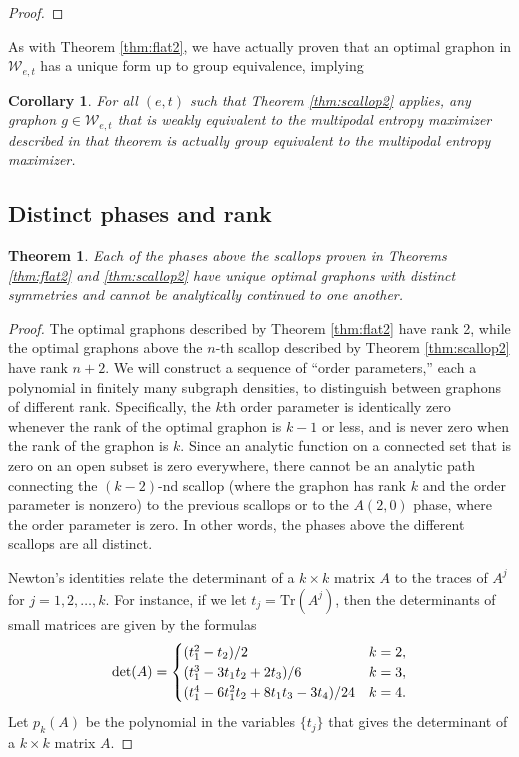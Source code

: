 \documentclass[12pt]{amsart}
\newtheorem{corollary}[lemma]{Corollary}
\newtheorem{theorem}[lemma]{Theorem}
\newcommand\TR{\mathrm{Tr}}
\newcommand\be{\begin{equation}}
\newcommand\ee{\end{equation}}
\newcommand{\regular}{\mathcal{W}}
\begin{document}
{\begin{proof}
\end{proof}

As with Theorem \ref{thm:flat2}, we have actually proven that an optimal graphon
in $\regular_{e,t}$ has a unique form up to group equivalence, implying

\begin{corollary} \label{cor:scallop2} For all $(e,t)$ such that Theorem 
\ref{thm:scallop2} applies, any graphon $g \in \regular_{e,t}$ that is weakly equivalent to the 
multipodal entropy maximizer described in that theorem is actually group 
equivalent to the multipodal entropy maximizer. 
\end{corollary}

\subsection{Distinct phases and rank}\label{OrderParam}

\begin{theorem} \label{thm:orderparameter2}
Each of the phases above the scallops proven in Theorems \ref{thm:flat2} and \ref{thm:scallop2} have unique optimal graphons with distinct symmetries and cannot be analytically continued to one another.
\end{theorem}

\begin{proof} 
The optimal graphons described by Theorem 
\ref{thm:flat2} have rank 2, while the optimal graphons above the 
$n$-th scallop described by Theorem \ref{thm:scallop2} have rank $n+2$.
We will construct a sequence of ``order parameters,'' each a polynomial
in finitely many subgraph densities, to distinguish between graphons 
of different rank. Specifically, the $k$th order parameter is 
identically zero whenever the rank of the optimal 
graphon is $k-1$ or less, and is never zero when the rank of the graphon is 
$k$. Since an analytic function on a connected set 
that is zero on an open subset is zero everywhere, there cannot be 
an analytic path connecting the $(k-2)$-nd scallop (where the graphon
has rank $k$ and the order parameter is nonzero) to the previous scallops
or to the $A(2,0)$ phase, where the order parameter is zero. 
In other words,
the phases above the different scallops are all distinct. 

Newton's identities relate the determinant of a $k \times k$ matrix $A$ to
the traces of $A^j$ for $j=1,2,\ldots, k$. For instance, if we let $t_j=\TR(A^j)$, then the determinants of small matrices are given by 
the formulas
\be \det(A) = \begin{cases} (t_1^2-t_2)/2 & k=2, \cr 
(t_1^3-3t_1t_2+2 t_3)/6 & k=3, \cr 
(t_1^4 - 6 t_1^2 t_2 + 8 t_1 t_3 -3 t_4)/24 & k=4. \end{cases} \ee
Let $p_k(A)$ be the polynomial in the variables $\{t_j\}$ 
that gives the determinant of a $k\times k$ matrix $A$. 


\end{proof}}
\end{document}
